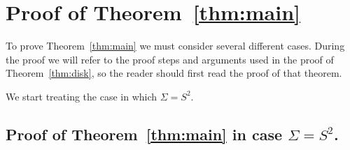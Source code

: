 \documentclass[AHL,Unicode,longabstracts,published]{cedram}
\begin{document}
\section{Proof of Theorem~\ref{thm:main}}

To prove Theorem~\ref{thm:main} we must consider several different cases. During the proof we will refer to the proof steps and arguments used in the proof of Theorem~\ref{thm:disk}, so the reader should first read the proof of that theorem.

We start treating the case in which $\Sigma=S^2$.

\break
\subsection{Proof of Theorem~\ref{thm:main} in case \texorpdfstring{$\Sigma = S^2$}{Sigma = S2}.} \label{sec:proofsphere}
\end{document}
